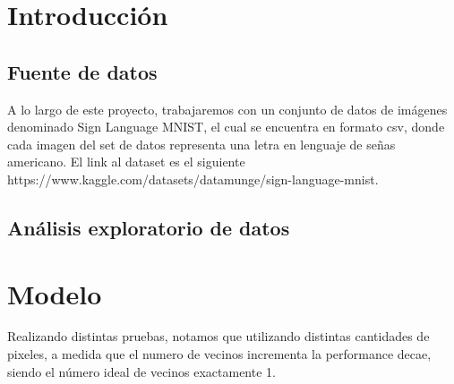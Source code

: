 \documentclass[10pt,a4paper]{article}
\begin{document}
\maketitle

\section{Introducción}

\subsection{Fuente de datos}

A lo largo de este proyecto, trabajaremos con un conjunto de datos de imágenes denominado Sign
Language MNIST, el cual se encuentra en formato csv, donde cada imagen del set de datos representa una letra en lenguaje de
señas americano. El link al dataset es el siguiente https://www.kaggle.com/datasets/datamunge/sign-language-mnist.

\subsection{Análisis exploratorio de datos}

\section{Modelo}
Realizando distintas pruebas, notamos que utilizando distintas cantidades de pixeles, a medida que el numero de vecinos incrementa
la performance decae, siendo el número ideal de vecinos exactamente 1.
\end{document}
